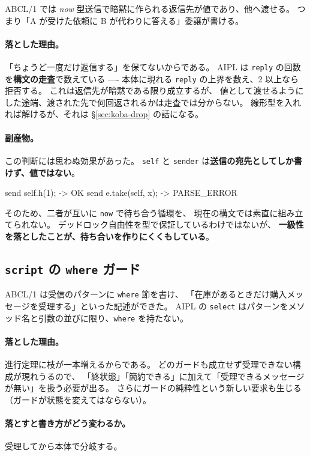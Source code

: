\documentclass[11pt,a4paper]{ltjsarticle}
\theoremstyle{definition}
\theoremstyle{remark}
\begin{document}
ABCL/1 では \emph{now} 型送信で暗黙に作られる返信先が値であり、他へ渡せる。
つまり「A が受けた依頼に B が代わりに答える」委譲が書ける。

\paragraph{落とした理由。}
「ちょうど一度だけ返信する」を保てないからである。
AIPL は \texttt{reply} の回数を\textbf{構文の走査}で数えている ----
本体に現れる \texttt{reply} の上界を数え、2 以上なら拒否する。
これは返信先が暗黙である限り成立するが、
値として渡せるようにした途端、渡された先で何回返されるかは走査では分からない。
線形型を入れれば解けるが、それは \S\ref{sec:koba-drop} の話になる。

\paragraph{副産物。}
この判断には思わぬ効果があった。
\texttt{self} と \texttt{sender} は\textbf{送信の宛先としてしか書けず、値ではない}。

\begin{term}
send self.h(1);          -> OK
send e.take(self, x);    -> PARSE_ERROR
\end{term}

そのため、二者が互いに \texttt{now} で待ち合う循環を、
現在の構文では素直に組み立てられない。
デッドロック自由性を型で保証しているわけではないが、
\textbf{一級性を落としたことが、待ち合いを作りにくくもしている}。

\subsection{\texttt{script} の \texttt{where} ガード}

ABCL/1 は受信のパターンに \texttt{where} 節を書け、
「在庫があるときだけ購入メッセージを受理する」といった記述ができた。
AIPL の \texttt{select} はパターンをメソッド名と引数の並びに限り、\texttt{where} を持たない。

\paragraph{落とした理由。}
進行定理に枝が一本増えるからである。
どのガードも成立せず受理できない構成が現れうるので、
「終状態」「簡約できる」に加えて「受理できるメッセージが無い」を扱う必要が出る。
さらにガードの純粋性という新しい要求も生じる（ガードが状態を変えてはならない）。

\paragraph{落とすと書き方がどう変わるか。}
受理してから本体で分岐する。
\end{document}
